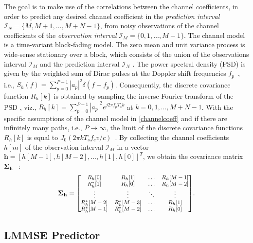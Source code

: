 \documentclass[12pt, draftclsnofoot, onecolumn]{IEEEtran}
\begin{document}
The goal is to make use of the correlations between the channel coefficients, in order to predict any desired channel coefficient in the \textit{prediction interval} $\mathcal{I}_N = \{M,M+1,\dots, M+N-1\}$, from noisy observations of the channel coefficients of the \textit{observation interval} $\mathcal{I}_M = \{0,1,\dots, M-1\}$. The channel model is a time-variant block-fading model. The zero mean and unit variance process is wide-sense stationary over a block, which consists of the union of the observations interval $\mathcal{I}_M$ and the prediction interval $\mathcal{I}_N$ \cite{Zemen, Zemen3}. The power spectral density (PSD) is given by the weighted sum of Dirac pulses at the Doppler shift frequencies $f_p$~\cite{Zemen, Goldsmith}, i.e., $ S_h(f) = \sum_{p=0}^{P-1} |a_p|^2 \delta(f-f_p) $. Consequently, the discrete covariance function $R_h[k]$ is obtained by sampling the inverse Fourier transform of the PSD \cite{Goldsmith, Bracewell2000}, viz., $
R_h[k] = \sum_{p=0}^{P-1} |a_p|^2 e^{j 2 \pi f_p T_s k} $ at $k = 0, 1, \dots, M+N-1$. With the specific assumptions of the channel model in \eqref{channelcoeff} and if there are infinitely many paths, i.e., $P\to\infty$, the limit of the discrete covariance functions $R_h[k]$ is equal to $ J_0(2\pi k T_s f_c {v}/{c})$~\cite{Zemen,Goldsmith,Jakes}. By collecting the channel coefficients $h[m]$ of the observation interval $\mathcal{I}_M$ in a vector $\mathbf{h} = [h[M-1], h[M-2], \dots, h[1], h[0]]^{T}$, we obtain the covariance matrix $\mathbf{\Sigma}_{\mathbf{h}}$  ~\cite{Zemen}:
\begin{equation}
    \footnotesize{
    \mathbf{\Sigma}_{\mathbf{h}} = 
\begin{bmatrix}
R_h[0]& R_h[1]      & \dots & R_h[M-1] \\  
R_h^*[1] & R_h[0]     & \dots & R_h[M-2] \\
\vdots   & \vdots & \ddots & \vdots \\
R_h^*[M-2] & R^*_h[M-3]  &   \dots & R_h[1] \\
R_h^*[M-1] & R^*_h[M-2]  &   \dots & R_h[0] \\
\end{bmatrix}}.
\label{covmatstandard}
\end{equation}

\subsection{LMMSE Predictor}
\label{sec:pagestyle}
\end{document}

